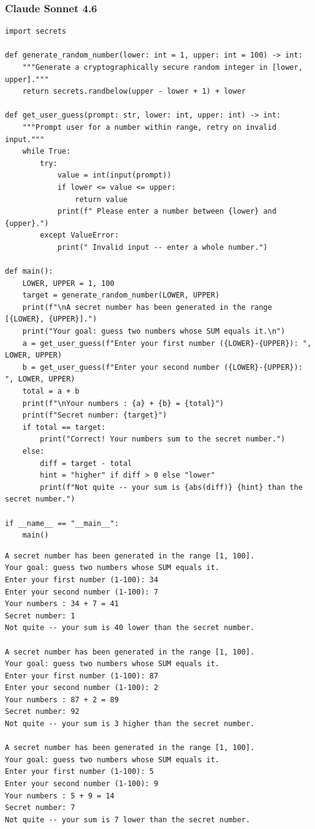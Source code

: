 \documentclass[12pt,a4paper]{article}
\begin{document}
\subsubsection*{Claude Sonnet 4.6}

\begin{lstlisting}[style=python, caption={Claude Sonnet 4.6-kode}]
import secrets

def generate_random_number(lower: int = 1, upper: int = 100) -> int:
    """Generate a cryptographically secure random integer in [lower, upper]."""
    return secrets.randbelow(upper - lower + 1) + lower

def get_user_guess(prompt: str, lower: int, upper: int) -> int:
    """Prompt user for a number within range, retry on invalid input."""
    while True:
        try:
            value = int(input(prompt))
            if lower <= value <= upper:
                return value
            print(f" Please enter a number between {lower} and {upper}.")
        except ValueError:
            print(" Invalid input -- enter a whole number.")

def main():
    LOWER, UPPER = 1, 100
    target = generate_random_number(LOWER, UPPER)
    print(f"\nA secret number has been generated in the range [{LOWER}, {UPPER}].")
    print("Your goal: guess two numbers whose SUM equals it.\n")
    a = get_user_guess(f"Enter your first number ({LOWER}-{UPPER}): ", LOWER, UPPER)
    b = get_user_guess(f"Enter your second number ({LOWER}-{UPPER}): ", LOWER, UPPER)
    total = a + b
    print(f"\nYour numbers : {a} + {b} = {total}")
    print(f"Secret number: {target}")
    if total == target:
        print("Correct! Your numbers sum to the secret number.")
    else:
        diff = target - total
        hint = "higher" if diff > 0 else "lower"
        print(f"Not quite -- your sum is {abs(diff)} {hint} than the secret number.")

if __name__ == "__main__":
    main()
\end{lstlisting}

\begin{lstlisting}[style=terminal, caption={Output fra Claude Sonnet 4.6-koden}]
A secret number has been generated in the range [1, 100].
Your goal: guess two numbers whose SUM equals it.
Enter your first number (1-100): 34
Enter your second number (1-100): 7
Your numbers : 34 + 7 = 41
Secret number: 1
Not quite -- your sum is 40 lower than the secret number.

A secret number has been generated in the range [1, 100].
Your goal: guess two numbers whose SUM equals it.
Enter your first number (1-100): 87
Enter your second number (1-100): 2
Your numbers : 87 + 2 = 89
Secret number: 92
Not quite -- your sum is 3 higher than the secret number.

A secret number has been generated in the range [1, 100].
Your goal: guess two numbers whose SUM equals it.
Enter your first number (1-100): 5
Enter your second number (1-100): 9
Your numbers : 5 + 9 = 14
Secret number: 7
Not quite -- your sum is 7 lower than the secret number.
\end{lstlisting}
\end{document}
